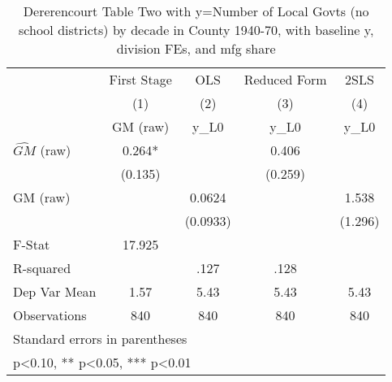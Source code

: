 \begin{table}[htbp]\centering
\def\sym#1{\ifmmode^{#1}\else\(^{#1}\)\fi}
\caption{Dererencourt Table Two with y=Number of Local Govts (no school districts) by decade in County 1940-70, with baseline y, division FEs, and mfg share}
\begin{tabular}{l*{4}{c}}
\toprule
                    & First Stage   &         OLS   &Reduced Form   &        2SLS   \\
                    &\multicolumn{1}{c}{(1)}&\multicolumn{1}{c}{(2)}&\multicolumn{1}{c}{(3)}&\multicolumn{1}{c}{(4)}\\
                    &\multicolumn{1}{c}{GM  (raw)}&\multicolumn{1}{c}{y\_L0}&\multicolumn{1}{c}{y\_L0}&\multicolumn{1}{c}{y\_L0}\\
\midrule
$\hat{GM}$ (raw)    &       0.264*  &               &       0.406   &               \\
                    &     (0.135)   &               &     (0.259)   &               \\
\addlinespace
GM  (raw)           &               &      0.0624   &               &       1.538   \\
                    &               &    (0.0933)   &               &     (1.296)   \\
\midrule
F-Stat              &      17.925   &               &               &               \\
R-squared           &               &        .127   &        .128   &               \\
Dep Var Mean        &        1.57   &        5.43   &        5.43   &        5.43   \\
Observations        &         840   &         840   &         840   &         840   \\
\bottomrule
\multicolumn{5}{l}{\footnotesize Standard errors in parentheses}\\
\multicolumn{5}{l}{\footnotesize * p<0.10, ** p<0.05, *** p<0.01}\\
\end{tabular}
\end{table}
